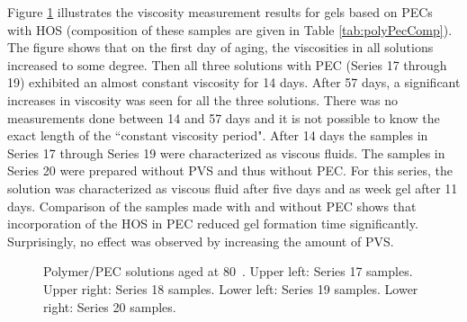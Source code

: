\documentclass[nanomaterials,article,submit,moreauthors,pdftex]{Definitions/mdpi}
\begin{document}

Figure \ref{cht:s17visc80} illustrates the viscosity measurement results for gels based on PECs with HOS (composition of these samples are given in Table \ref{tab:polyPecComp}). The figure shows that on the first day of aging, the viscosities in all solutions increased to some degree. Then all three solutions with PEC (Series 17 through 19) exhibited an almost constant viscosity for 14 days. After 57 days, a significant increases in viscosity was seen for all the three solutions. There was no measurements done between 14 and 57 days and it is not possible to know the exact length of the ``constant viscosity period". After 14 days the samples in Series 17 through Series 19 were characterized as viscous fluids. The samples in Series 20 were prepared without PVS and thus without PEC. For this series, the solution was characterized as viscous fluid after five days and as week gel after 11 days. Comparison of the samples made with and without PEC shows that incorporation of the HOS in PEC reduced gel formation time significantly. Surprisingly, no effect was observed by increasing the amount of PVS.

\begin{figure}[h!]
    \centering
    \caption{Polymer/PEC solutions aged at 80~\celsius. Upper left: Series 17 samples. Upper right: Series 18 samples. Lower left: Series 19 samples. Lower right: Series 20 samples.}
    \label{cht:s17visc80}
\end{figure}
\end{document}
